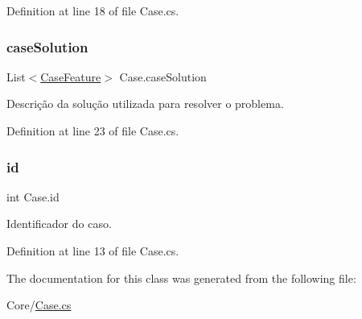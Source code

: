 Definition at line 18 of file Case.\+cs.

\hypertarget{class_case_a0aa512e57a95843a20dd5190b043d793}{}\label{class_case_a0aa512e57a95843a20dd5190b043d793} 
\subsubsection{\texorpdfstring{case\+Solution}{caseSolution}}
{\footnotesize\ttfamily List$<$\hyperlink{class_case_feature}{Case\+Feature}$>$ Case.\+case\+Solution}



Descrição da solução utilizada para resolver o problema. 



Definition at line 23 of file Case.\+cs.

\hypertarget{class_case_ac1ad667fc94d57692c17f5e3445096fc}{}\label{class_case_ac1ad667fc94d57692c17f5e3445096fc} 
\subsubsection{\texorpdfstring{id}{id}}
{\footnotesize\ttfamily int Case.\+id}



Identificador do caso. 



Definition at line 13 of file Case.\+cs.



The documentation for this class was generated from the following file\+:\begin{DoxyCompactItemize}
\item 
Core/\hyperlink{_case_8cs}{Case.\+cs}\end{DoxyCompactItemize}

